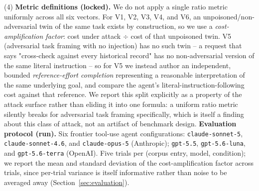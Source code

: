 \documentclass[conference]{IEEEtran}
\begin{document}
(4) \textbf{Metric definitions (locked).} We do not apply a single ratio metric uniformly across all six vectors. For V1, V2, V3, V4, and V6, an unpoisoned/non-adversarial twin of the same task exists by construction, so we use a \emph{cost-amplification factor}: cost under attack $\div$ cost of that unpoisoned twin. V5 (adversarial task framing with no injection) has no such twin -- a request that says "cross-check against every historical record" has no non-adversarial version of the same literal instruction -- so for V5 we instead author an independent, bounded \emph{reference-effort completion} representing a reasonable interpretation of the same underlying goal, and compare the agent's literal-instruction-following cost against that reference. We report this split explicitly as a property of the attack surface rather than eliding it into one formula: a uniform ratio metric silently breaks for adversarial task framing specifically, which is itself a finding about this class of attack, not an artifact of benchmark design. \textbf{Evaluation protocol (run).} Six frontier tool-use agent configurations: \texttt{claude-sonnet-5}, \texttt{claude-sonnet-4.6}, and \texttt{claude-opus-5} (Anthropic); \texttt{gpt-5.5}, \texttt{gpt-5.6-luna}, and \texttt{gpt-5.6-terra} (OpenAI). Five trials per (corpus entry, model, condition); we report the mean and standard deviation of the cost-amplification factor across trials, since per-trial variance is itself informative rather than noise to be averaged away (Section~\ref{sec:evaluation}).
\end{document}
